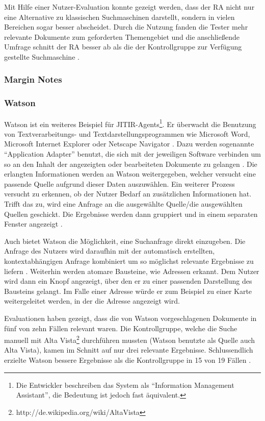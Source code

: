  	Mit Hilfe einer Nutzer-Evaluation konnte gezeigt werden, dass der RA nicht nur eine Alternative zu klassischen Suchmaschinen darstellt, sondern in vielen Bereichen sogar besser abscheidet. Durch die Nutzung fanden die Tester mehr relevante Dokumente zum geforderten Themengebiet und die anschließende Umfrage schnitt der RA besser ab als die der Kontrollgruppe zur Verfügung gestellte Suchmaschine \cite{rhodes2000just}.

 	\subsubsection{Margin Notes}
 	\subsubsection{Watson}
 	Watson ist ein weiteres Beispiel für JITIR-Agents\footnote{Die Entwickler beschreiben das System als ``Information Management Assistant'', die Bedeutung ist jedoch fast äquivalent.}. Er überwacht die Benutzung von Textverarbeitungs- und Textdarstellungsprogrammen wie Microsoft Word, Microsoft Internet Explorer oder Netscape Navigator \cite{budzik1999watson}. Dazu werden sogenannte ``Application Adapter'' benutzt, die sich mit der jeweiligen Software verbinden um so an den Inhalt der angezeigten oder bearbeiteten Dokumente zu gelangen \cite{budzik2000user}. Die erlangten Informationen werden an Watson weitergegeben, welcher versucht eine passende Quelle aufgrund dieser Daten auszuwählen. Ein weiterer Prozess versucht zu erkennen, ob der Nutzer Bedarf an zusätzlichen Informationen hat. Trifft das zu, wird eine Anfrage an die ausgewählte Quelle/die ausgewählten Quellen geschickt. Die Ergebnisse werden dann gruppiert und in einem separaten Fenster angezeigt \cite{budzik1999watson}.

 	Auch bietet Watson die Möglichkeit, eine Suchanfrage direkt einzugeben. Die Anfrage des Nutzers wird daraufhin mit der automatisch erstellten, kontextabhängigen Anfrage kombiniert um so möglichst relevante Ergebnisse zu liefern \cite{budzik2000user}. Weiterhin werden atomare Bausteine, wie Adressen erkannt. Dem Nutzer wird dann ein Knopf angezeigt, über den er zu einer passenden Darstellung des Bausteins gelangt. Im Falle einer Adresse würde er zum Beispiel zu einer Karte weitergeleitet werden, in der die Adresse angezeigt wird.

 	Evaluationen haben gezeigt, dass die von Watson vorgeschlagenen Dokumente in fünf von zehn Fällen relevant waren. Die Kontrollgruppe, welche die Suche manuell mit Alta Vista\footnote{http://de.wikipedia.org/wiki/AltaVista} durchführen mussten (Watson benutzte als Quelle auch Alta Vista), kamen im Schnitt auf nur drei relevante Ergebnisse. Schlussendlich erzielte Watson bessere Ergebnisse als die Kontrollgruppe in 15 von 19 Fällen \cite{budzik1999watson}.

